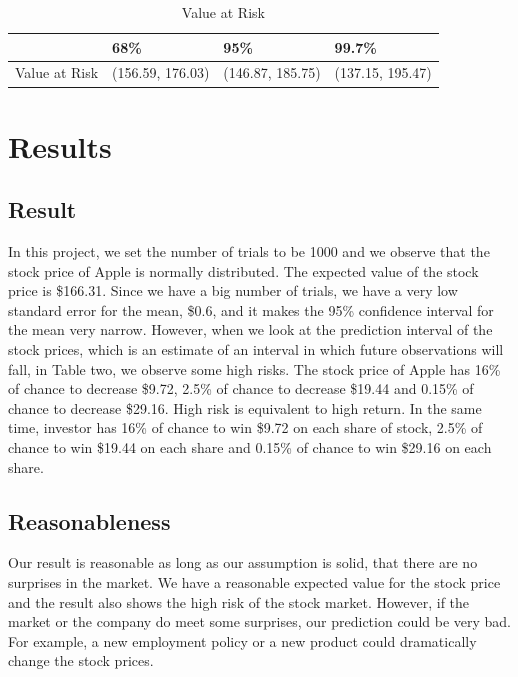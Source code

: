 \documentclass{article}
\begin{document}
\begin{table}[hbt]
\centering
\caption{Value at Risk}
\label{VaR}
\begin{tabular}{|l|l|l|l|}
\hline
\multicolumn{1}{|c|}{} & 68\%             & 95\%             & 99.7\%           \\ \hline
Value at Risk          & (156.59, 176.03) & (146.87, 185.75) & (137.15, 195.47) \\ \hline
\end{tabular}
\end{table}



\section{Results}


\subsection{Result}
In this project, we set the number of trials to be 1000 and we observe that the stock price of Apple is normally distributed. The expected value of the stock price is \$166.31. Since we have a big number of trials, we have a very low standard error for the mean, \$0.6, and it makes the 95\% confidence interval for the mean very narrow. However, when we look at the prediction interval of the stock prices, which is an estimate of an interval in which future observations will fall, in Table two, we observe some high risks.  The stock price of Apple has 16\% of chance to decrease \$9.72, 2.5\% of chance to decrease \$19.44 and 0.15\% of chance to decrease \$29.16. High risk is equivalent to high return. In the same time, investor has 16\% of chance to win \$9.72 on each share of stock, 2.5\% of chance to win \$19.44 on each share and 0.15\% of chance to win \$29.16 on each share. 


\subsection{Reasonableness}
Our result is reasonable as long as our assumption is solid, that there are no surprises in the market. We have a reasonable expected value for the stock price and the result also shows the high risk of the stock market. However, if the market or the company do meet some surprises, our prediction could be very bad. For example, a new employment policy or a new product could dramatically change the stock prices.
\end{document}
